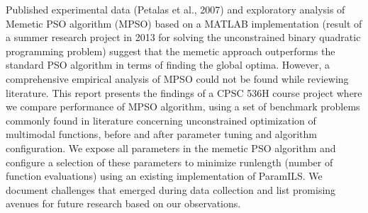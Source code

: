 Published experimental data (Petalas et al., 2007) and exploratory analysis of Memetic PSO algorithm (MPSO) based on a MATLAB implementation (result of a summer research project in 2013 for solving the unconstrained binary quadratic programming problem) suggest that the memetic approach outperforms the standard PSO algorithm in terms of finding the global optima. However, a comprehensive empirical analysis of MPSO could not be found while reviewing literature. This report presents the findings of a CPSC 536H course project where we compare performance of MPSO algorithm, using a set of benchmark problems commonly found in literature concerning unconstrained optimization of multimodal functions, before and after parameter tuning and algorithm configuration. We expose all parameters in the memetic PSO algorithm and configure a selection of these parameters to minimize runlength (number of function evaluations) using an existing implementation of ParamILS. We document challenges that emerged during data collection and list promising avenues for future research based on our observations.